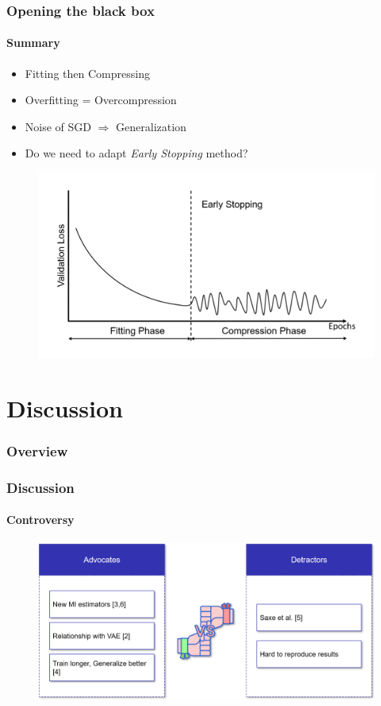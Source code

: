 \documentclass[10pt]{beamer}
\begin{document}
\begin{frame}
\frametitle{Opening the black box}
\framesubtitle{Summary}
\begin{itemize}
\item Fitting then Compressing
\item Overfitting = Overcompression
\item Noise of SGD $\Rightarrow$ Generalization
\item Do we need to adapt \textit{Early Stopping} method? 
\end{itemize}
\vspace*{-1.5mm}
\begin{figure}
\centering
\includegraphics[scale=0.32]{figs/early-stopping.png}
\end{figure}
\end{frame}

\section{Discussion} 

\begin{frame}
\frametitle{Overview}
\tableofcontents[currentsection,subsectionstyle=shaded]
\end{frame}

\begin{frame}
\frametitle{Discussion}
\framesubtitle{Controversy}
\begin{figure}
\centering
\includegraphics[scale=0.4]{figs/vs2.png}
\end{figure}
\end{frame}
\end{document}
